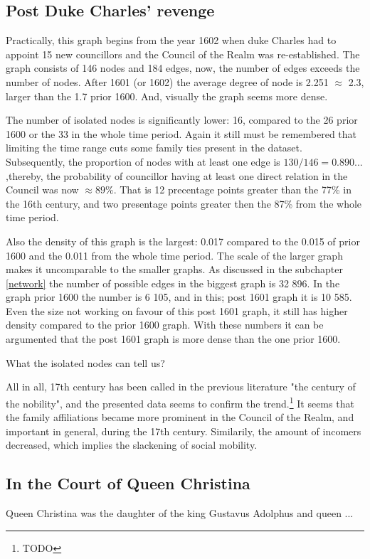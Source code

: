 \subsection{Post Duke Charles' revenge}
Practically, this graph begins from the year 1602 when duke Charles had to appoint 15 new councillors and the Council of the Realm was re-established. The graph consists of 146 nodes and 184 edges, now, the number of edges exceeds the number of nodes. After 1601 (or 1602) the average degree of node is 2.251 $\approx$ 2.3, larger than the 1.7 prior 1600. And, visually the graph seems more dense. 

The number of isolated nodes is significantly lower: 16, compared to the 26 prior 1600 or the 33 in the whole time period. Again it still must be remembered that limiting the time range cuts some family ties present in the dataset. Subsequently, the proportion of nodes with at least one edge is $130/146=0.890...$ ,thereby, the probability of councillor having at least one direct relation in the Council was now $\approx 89\%$. That is 12 precentage points greater than the 77\% in the 16th century, and two presentage points greater then the 87\% from the whole time period.

Also the density of this graph is the largest: 0.017 compared to the 0.015 of prior 1600 and the 0.011 from the whole time period. The scale of the larger graph makes it uncomparable to the smaller graphs. As discussed in the subchapter \ref{network} the number of possible edges in the biggest graph is 32 896. In the graph prior 1600 the number is 6 105, and in this; post 1601 graph it is 10 585. Even the size not working on favour of this post 1601 graph, it still has higher density compared to the prior 1600 graph. With these numbers it can be argumented that the post 1601 graph is more dense than the one prior 1600. 

What the isolated nodes can tell us?

All in all, 17th century has been called in the previous literature "the century of the nobility", and the presented data seems to confirm the trend.\footnote{TODO} It seems that the family affiliations became more prominent in the Council of the Realm, and important in general, during the 17th century. Similarily, the amount of incomers decreased, which implies the slackening of social mobility.

\subsection{In the Court of Queen Christina}
\label{christina}
Queen Christina was the daughter of the king Gustavus Adolphus and queen ...

